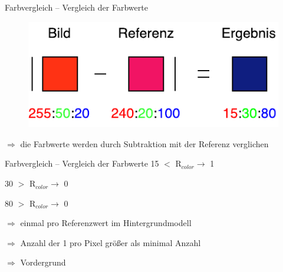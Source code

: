 \documentclass[hyperref={pdfpagelabels=false}]{beamer}
\begin{document}
\begin{frame}[t]{Farbvergleich -- Vergleich der Farbwerte}
	\bigskip
	\bigskip
	\bigskip

	\begin{figure}
		\centering
		\includegraphics[width=0.6\linewidth]{Abbildungen/Farb_Vergleich2.pdf}
		\label{fig:Abbildungen/Grid}
	\end{figure}
	\centering
	\bigskip
	$\Rightarrow$ die Farbwerte werden durch Subtraktion mit der Referenz verglichen
\end{frame}

\begin{frame}[t]{Farbvergleich -- Vergleich der Farbwerte}
	\centering
	\bigskip
	\bigskip
	\bigskip
	\color{red}
	15 $<$ R$_{color} \rightarrow$ 1

	\bigskip
	\color{green}
	30 $>$ R$_{color} \rightarrow$ 0
	
	\bigskip
	\color{blue}
	80 $>$ R$_{color} \rightarrow$ 0

	\color{black}
	\bigskip
	\bigskip
	$\Rightarrow$ einmal pro Referenzwert im Hintergrundmodell
	\bigskip
	
	$\Rightarrow$ Anzahl der 1 pro Pixel größer als minimal Anzahl
	\bigskip
	
	$\Rightarrow$ Vordergrund
\end{frame}
\end{document}
